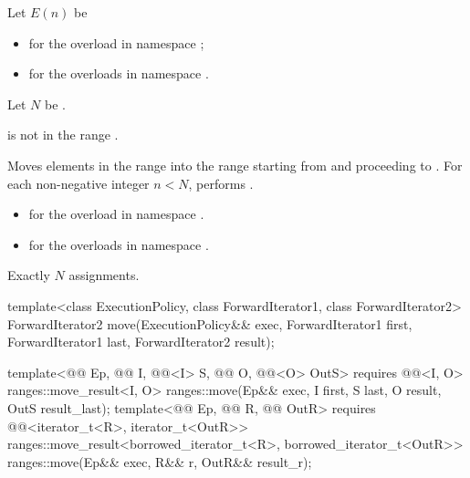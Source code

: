 \begin{itemdescr}
\pnum
Let $E(n)$ be
\begin{itemize}
\item
  for the overload in namespace ;
\item
  for the overloads in namespace .
\end{itemize}
Let $N$ be .

\pnum
\expects
{} is not in the range .

\pnum
\effects
Moves elements in the range 
into the range 
starting from  and proceeding to .
For each non-negative integer $n < N$, performs .

\pnum
\returns
\begin{itemize}
\item
  for the overload in namespace .
\item
  for the overloads in namespace .
\end{itemize}

\pnum
\complexity
Exactly $N$ assignments.
\end{itemdescr}

%
\begin{itemdecl}
template<class ExecutionPolicy, class ForwardIterator1, class ForwardIterator2>
  ForwardIterator2 move(ExecutionPolicy&& exec,
                        ForwardIterator1 first, ForwardIterator1 last,
                        ForwardIterator2 result);

template<@@ Ep, @@ I, @@<I> S,
         @@ O, @@<O> OutS>
  requires @@<I, O>
  ranges::move_result<I, O>
    ranges::move(Ep&& exec, I first, S last, O result, OutS result_last);
template<@@ Ep, @@ R, @@ OutR>
  requires @@<iterator_t<R>, iterator_t<OutR>>
  ranges::move_result<borrowed_iterator_t<R>, borrowed_iterator_t<OutR>>
    ranges::move(Ep&& exec, R&& r, OutR&& result_r);
\end{itemdecl}

